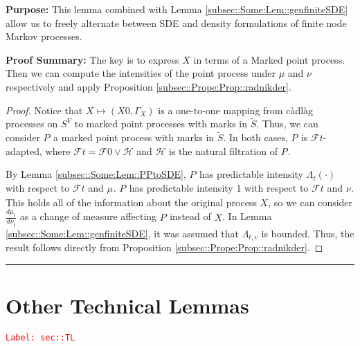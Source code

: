 \documentclass[12pt]{article}
\newcommand{\mc}{\mathcal}
\newcommand{\tr}{\textcolor{red}}
\newcommand{\labe}[1]{\tr{\texttt{Label: #1}}}
\newcommand{\purpose}{\textbf{Purpose: }}
\newcommand{\pfsum}{\textbf{Proof Summary: }}
\newcommand{\ind}{\hspace{24pt}}
\newcommand{\lin}{\rule{\linewidth}{0.4 pt}}
\renewcommand{\v}{v}							%
\renewcommand{\S}{S}							%
\renewcommand{\t}{t}							%
\newcommand{\F}{\mc{F}}							%
\newcommand{\FH}[2]{\mc{H}}						%
\newcommand{\X}{X}								%
\newcommand{\rp}[1]{P^{#1}}							%
\newcommand{\m}[3]{\mu_{#2#1}^{#3}}						%
\newcommand{\mm}[3]{\nu_{#2#1}^{#3}}						%
\newcommand{\ratee}[1]{\Lambda_{#1}}				%
\newcommand{\alt}{\widetilde}						%
\newcommand{\pmap}[1]{\Gamma_{#1}}				%
\begin{document}
\purpose This lemma combined with Lemma \ref{subsec::Some:Lem::genfiniteSDE} allow us to freely alternate between SDE and density formulations of finite node Markov processes.

\pfsum The key is to express \(X\) in terms of a Marked point process. Then we can compute the intensities of the point process under \(\mu\) and \(\nu\) respectively and apply Proposition \ref{subsec::Prope:Prop::radnikder}.

\begin{proof}
Notice that \(\X{}{} \mapsto (\X{}{0},\pmap{\X{}{}})\) is a one-to-one mapping from c\`adl\`ag processes on \(\S^ V\) to marked point processes with marks in \(\alt{\S}\). Thus, we can consider \(\rp{}\) a marked point process with marks in \(\alt{\S}\). In both cases, \(\rp{}\) is \(\F{}{\t}\)-adapted, where \(\F{}{\t} = \F{}{0}\vee \FH{}{\t}\) and \(\FH{}{\t}\) is the natural filtration of \(\rp{}\).

\ind By Lemma \ref{subsec::Some:Lem::PPtoSDE}, \(\rp{}\) has predictable intensity \(\ratee{\t}(\cdot)\) with respect to \(\F{}{\t}\) and \(\m{}{}{}\). \(\rp{}\) has predictable intensity 1 with respect to \(\F{}{\t}\) and \(\mm{}{}{}\). This holds all of the information about the original process \(\X{}{}\), so we can consider \(\frac{d\m{}{\t}{}}{d\mm{}{\t}{}}\) as a change of measure affecting \(\rp{}\) instead of \(\X{}{}\). In Lemma \ref{subsec::Some:Lem::genfiniteSDE}, it was assumed that \(\ratee{\t,\v}\) is bounded. Thus, the result follows directly from Proposition \ref{subsec::Prope:Prop::radnikder}. 
\end{proof}

\lin
\section{Other Technical Lemmas}
\label{sec::TL}\labe{sec::TL}
\end{document}
